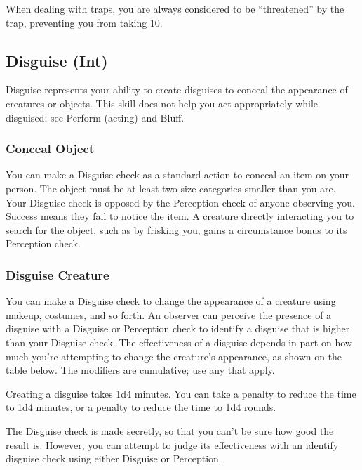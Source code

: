 When dealing with traps, you are always considered to be ``threatened'' by the trap, preventing you from taking 10.


\subsection{Disguise (Int)}
Disguise represents your ability to create disguises to conceal the appearance of creatures or objects. This skill does not help you act appropriately while disguised; see Perform (acting) and Bluff.

\subsubsection{Conceal Object}
You can make a Disguise check as a standard action to conceal an item on your person. The object must be at least two size categories smaller than you are. Your Disguise check is opposed by the Perception check of anyone observing you. Success means they fail to notice the item. A creature directly interacting you to search for the object, such as by frisking you, gains a  circumstance bonus to its Perception check.

\subsubsection{Disguise Creature}
You can make a Disguise check to change the appearance of a creature using makeup, costumes, and so forth. An observer can perceive the presence of a disguise with a Disguise or Perception check to identify a disguise that is higher than your Disguise check. The effectiveness of a disguise depends in part on how much you're attempting to change the creature's appearance, as shown on the table below. The modifiers are cumulative; use any that apply.

Creating a disguise takes 1d4  minutes. You can take a  penalty to reduce the time to 1d4 minutes, or a  penalty to reduce the time to 1d4 rounds.

The Disguise check is made secretly, so that you can't be sure how good the result is. However, you can attempt to judge its effectiveness with an identify disguise check using either Disguise or Perception. 

